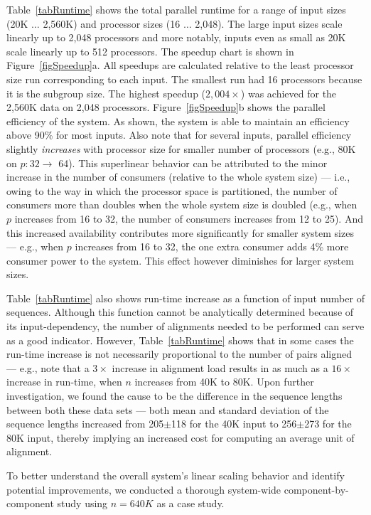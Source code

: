 \documentclass[10pt,journal,letterpaper,compsoc]{IEEEtran}
\begin{document}
Table~\ref{tabRuntime} shows the total parallel runtime for a range of input sizes (20K $\ldots$ 2,560K) and processor sizes (16 $\ldots$ 2,048). The large input sizes scale linearly up to 2,048 processors and more notably, inputs even as small as 20K scale linearly up to 512 processors. The speedup chart is shown in Figure~\ref{figSpeedup}a. All speedups are calculated relative to the least processor size run corresponding to each input. The smallest run had 16 processors because it is the subgroup size. The highest speedup ($2,004\times$) was achieved for the 2,560K data on 2,048 processors. Figure~\ref{figSpeedup}b shows the parallel efficiency of the system. As shown, the system is able to maintain an efficiency above 90\% for most inputs. Also note that for several inputs, parallel efficiency slightly \emph{increases} with processor size for smaller number of processors (e.g., 80K on $p:32\rightarrow$ 64). This superlinear behavior can be attributed to the minor increase in the number of consumers (relative to the whole system size) --- i.e., owing to the way in which the processor space is partitioned, the number of consumers more than doubles when the whole system size is doubled (e.g., when $p$ increases from 16 to 32, the number of consumers increases from 12 to 25). And this increased availability contributes more significantly for smaller system sizes --- e.g., when $p$ increases from 16 to 32, the one extra consumer adds 4\% more consumer power to the system. This effect however diminishes for larger system sizes.


Table~\ref{tabRuntime} also shows run-time increase as a function of input number of sequences. Although this function cannot be analytically determined because of its input-dependency, the number of alignments needed to be performed can serve as a good indicator. However, Table~\ref{tabRuntime} shows that in some cases the run-time increase is not necessarily proportional to the number of pairs aligned --- e.g., note that a $3\times$ increase in alignment load results in as much as a $16\times$ increase in run-time, when $n$ increases from 40K to 80K. Upon further investigation, we found the cause to be the difference in the sequence lengths between both these data sets --- both mean and standard deviation of the sequence lengths increased from 205$\pm$118 for the 40K input to 256$\pm$273 for the 80K input, thereby implying an increased cost for computing an average unit of alignment. 

To better understand the overall system's linear scaling behavior and identify potential improvements, we conducted a thorough system-wide component-by-component study using $n=640K$ as a case study. 
\end{document}

